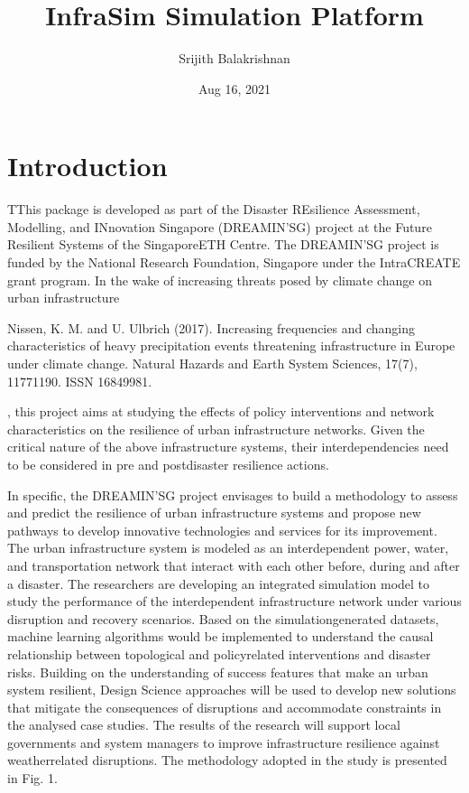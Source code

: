 \documentclass[letterpaper,10pt,english]{sphinxmanual}
\title{InfraSim Simulation Platform}
\date{Aug 16, 2021}
\author{Srijith Balakrishnan}
\begin{document}
\pagestyle{empty}
\sphinxmaketitle
\pagestyle{plain}
\sphinxtableofcontents
\pagestyle{normal}
\label{\detokenize{index::doc}}



\chapter{Introduction}
\label{\detokenize{intro:introduction}}\label{\detokenize{intro::doc}}
\sphinxAtStartPar
TThis package is developed as part of the Disaster REsilience Assessment,
Modelling, and INno\sphinxhyphen{}vation Singapore (DREAMIN’SG) project at the Future
Resilient Systems of the Singapore\sphinxhyphen{}ETH Centre. The DREAMIN’SG project is
funded by the National Research Foundation, Singapore under the Intra\sphinxhyphen{}CREATE
grant program. In the wake of increasing threats posed by climate change
on urban infrastructure %
\begin{footnote}[1]\sphinxAtStartFootnote
Nissen, K. M. and U. Ulbrich (2017). Increasing frequencies and changing characteristics of heavy precipitation events threatening infrastructure in Europe under climate change. Natural Hazards and Earth System Sciences, 17(7), 1177\textendash{}1190. ISSN 16849981.
%
\end{footnote}, this project aims at
studying the effects of policy interventions and network characteristics on
the resilience of urban infrastructure networks. Given the critical nature of
the above infrastructure systems, their interdependencies need to be
considered in pre\sphinxhyphen{} and post\sphinxhyphen{}disaster resilience actions.

\sphinxAtStartPar
In specific, the DREAMIN’SG project envisages to build a methodology to assess and predict
the resilience of urban infrastructure systems and propose new pathways to
develop innovative technologies and services for its improvement. The urban
infrastructure system is modeled as an interdependent power\sphinxhyphen{}, water\sphinxhyphen{}, and
transportation network that interact with each other before, during and
after a disaster. The researchers are developing an integrated simulation
model to study the performance of the interdependent infrastructure network
under various disruption and recov\sphinxhyphen{}ery scenarios. Based on the
simulation\sphinxhyphen{}generated datasets, machine learning algorithms would be implemented
to understand the causal relationship between topological and policy\sphinxhyphen{}related
interventions and disaster risks. Building on the understanding of success
features that make an urban system resilient, Design Science approaches will
be used to develop new solutions that mitigate the consequences of
disruptions and accommodate constraints in the analysed case studies.
The results of the research will support local governments and system managers
to improve infrastructure resilience against weather\sphinxhyphen{}related disruptions.
The methodology adopted in the study is presented in Fig. 1.
\end{document}
